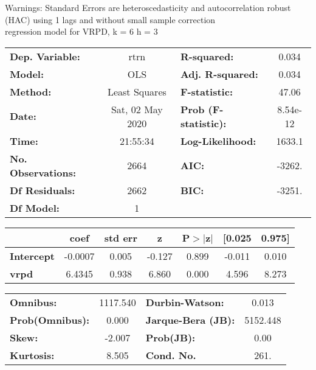 Warnings: \newline
 [1] Standard Errors are heteroscedasticity and autocorrelation robust (HAC) using 1 lags and without small sample correction\\ 

regression model for VRPD, k = 6 h = 3\begin{center}
\begin{tabular}{lclc}
\toprule
\textbf{Dep. Variable:}    &       rtrn       & \textbf{  R-squared:         } &     0.034   \\
\textbf{Model:}            &       OLS        & \textbf{  Adj. R-squared:    } &     0.034   \\
\textbf{Method:}           &  Least Squares   & \textbf{  F-statistic:       } &     47.06   \\
\textbf{Date:}             & Sat, 02 May 2020 & \textbf{  Prob (F-statistic):} &  8.54e-12   \\
\textbf{Time:}             &     21:55:34     & \textbf{  Log-Likelihood:    } &    1633.1   \\
\textbf{No. Observations:} &        2664      & \textbf{  AIC:               } &    -3262.   \\
\textbf{Df Residuals:}     &        2662      & \textbf{  BIC:               } &    -3251.   \\
\textbf{Df Model:}         &           1      & \textbf{                     } &             \\
\bottomrule
\end{tabular}
\begin{tabular}{lcccccc}
                   & \textbf{coef} & \textbf{std err} & \textbf{z} & \textbf{P$> |$z$|$} & \textbf{[0.025} & \textbf{0.975]}  \\
\midrule
\textbf{Intercept} &      -0.0007  &        0.005     &    -0.127  &         0.899        &       -0.011    &        0.010     \\
\textbf{vrpd}      &       6.4345  &        0.938     &     6.860  &         0.000        &        4.596    &        8.273     \\
\bottomrule
\end{tabular}
\begin{tabular}{lclc}
\textbf{Omnibus:}       & 1117.540 & \textbf{  Durbin-Watson:     } &    0.013  \\
\textbf{Prob(Omnibus):} &   0.000  & \textbf{  Jarque-Bera (JB):  } & 5152.448  \\
\textbf{Skew:}          &  -2.007  & \textbf{  Prob(JB):          } &     0.00  \\
\textbf{Kurtosis:}      &   8.505  & \textbf{  Cond. No.          } &     261.  \\
\bottomrule
\end{tabular}
\end{center}


